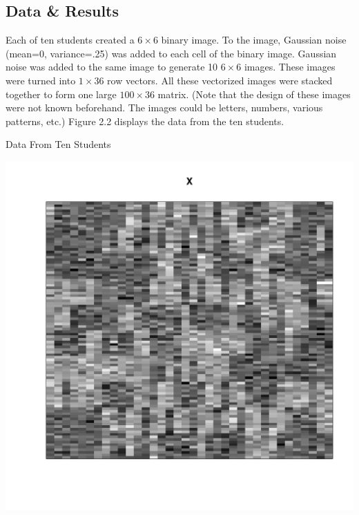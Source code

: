 \subsection{Data \& Results}
Each of ten students created a $6 \times 6$ binary image. To the
image, Gaussian noise (mean=0, variance=.25) was added to each cell of the
binary image. Gaussian noise was added to the same image to generate 10 $6
\times 6$ images. These images were turned into $1 \times 36$ row vectors. All
these vectorized images were stacked together to form one large $100 \times 36$
matrix. (Note that the design of these images were not known beforehand. The
images could be letters, numbers, various patterns, etc.)
Figure 2.2 displays the data from the ten students.\\

\beginmyfig
  \vspace{-5mm}
  \caption{Data From Ten Students}
  \vspace{-2mm}
  \includegraphics{images/Y.pdf}
  \vspace{-20mm}
\endmyfig

